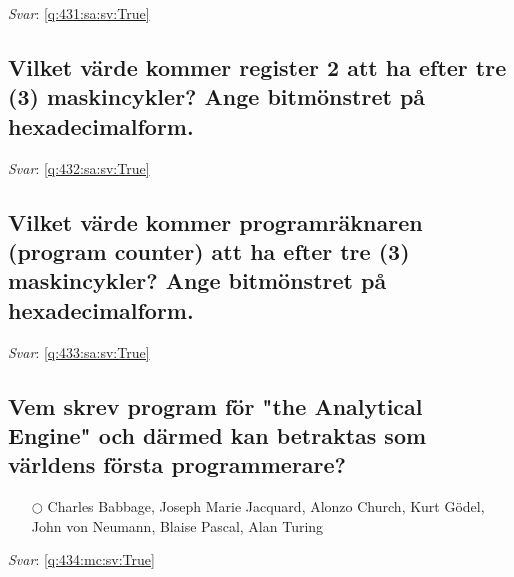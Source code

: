 \documentclass[a4paper,11pt,oneside]{article}
\begin{document}
\begin{sloppypar}
\textit{Svar}: \autoref{q:431:sa:sv:True}



\subsection{Vilket v\"arde kommer register 2 att ha efter tre (3) maskincykler? Ange bitm\"onstret p\r{a} hexadecimalform.}

\label{q:432:sa:sv:False}

\vspace{2cm}

\noindent\makebox[\textwidth]{\hrulefill}

\vspace{1cm}

\textit{Svar}: \autoref{q:432:sa:sv:True}



\subsection{Vilket v\"arde kommer programr\"aknaren (program counter) att ha efter tre (3) maskincykler? Ange bitm\"onstret p\r{a} hexadecimalform.}

\label{q:433:sa:sv:False}

\vspace{2cm}

\noindent\makebox[\textwidth]{\hrulefill}

\vspace{1cm}

\textit{Svar}: \autoref{q:433:sa:sv:True}



\subsection{Vem skrev program f\"or "the Analytical Engine" och d\"armed kan betraktas som v\"arldens f\"orsta programmerare?}

\label{q:434:mc:sv:False}

\begin{itemize}
  \item[$\bigcirc$] Charles Babbage, Joseph Marie Jacquard, Alonzo Church, Kurt G\"odel, John von Neumann, Blaise Pascal, Alan Turing
\end{itemize}

\vspace{1cm}

\textit{Svar}: \autoref{q:434:mc:sv:True}




\end{sloppypar}
\end{document}
